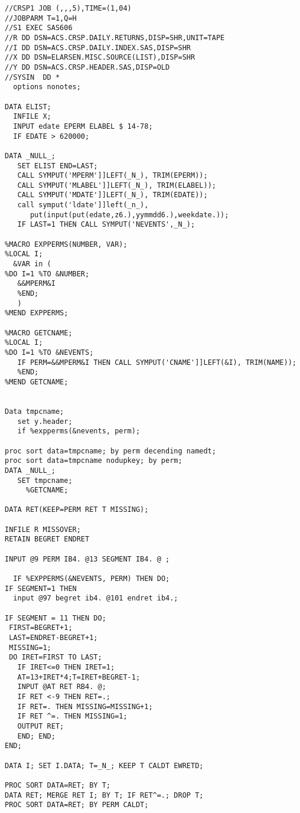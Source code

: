 \begin{singlespace}
\begin{lstlisting}[language=sas,caption=Event studies with SAS]
//CRSP1 JOB (,,,5),TIME=(1,04)
//JOBPARM T=1,Q=H
//S1 EXEC SAS606
//R DD DSN=ACS.CRSP.DAILY.RETURNS,DISP=SHR,UNIT=TAPE
//I DD DSN=ACS.CRSP.DAILY.INDEX.SAS,DISP=SHR
//X DD DSN=ELARSEN.MISC.SOURCE(LIST),DISP=SHR
//Y DD DSN=ACS.CRSP.HEADER.SAS,DISP=OLD
//SYSIN  DD *
  options nonotes;

DATA ELIST;
  INFILE X;
  INPUT edate EPERM ELABEL $ 14-78;
  IF EDATE > 620000;

DATA _NULL_;
   SET ELIST END=LAST;
   CALL SYMPUT('MPERM']]LEFT(_N_), TRIM(EPERM));
   CALL SYMPUT('MLABEL']]LEFT(_N_), TRIM(ELABEL));
   CALL SYMPUT('MDATE']]LEFT(_N_), TRIM(EDATE));
   call symput('ldate']]left(_n_),
      put(input(put(edate,z6.),yymmdd6.),weekdate.));
   IF LAST=1 THEN CALL SYMPUT('NEVENTS',_N_);

%MACRO EXPPERMS(NUMBER, VAR);
%LOCAL I;
  &VAR in (
%DO I=1 %TO &NUMBER;
   &&MPERM&I
   %END;
   )
%MEND EXPPERMS;

%MACRO GETCNAME;
%LOCAL I;
%DO I=1 %TO &NEVENTS;
   IF PERM=&&MPERM&I THEN CALL SYMPUT('CNAME']]LEFT(&I), TRIM(NAME));
   %END;
%MEND GETCNAME;


Data tmpcname;
   set y.header;
   if %expperms(&nevents, perm);

proc sort data=tmpcname; by perm decending namedt;
proc sort data=tmpcname nodupkey; by perm;
DATA _NULL_;
   SET tmpcname;
     %GETCNAME;

DATA RET(KEEP=PERM RET T MISSING);

INFILE R MISSOVER;
RETAIN BEGRET ENDRET

INPUT @9 PERM IB4. @13 SEGMENT IB4. @ ;

  IF %EXPPERMS(&NEVENTS, PERM) THEN DO;
IF SEGMENT=1 THEN
  input @97 begret ib4. @101 endret ib4.;

IF SEGMENT = 11 THEN DO;
 FIRST=BEGRET+1;
 LAST=ENDRET-BEGRET+1;
 MISSING=1;
 DO IRET=FIRST TO LAST;
   IF IRET<=0 THEN IRET=1;
   AT=13+IRET*4;T=IRET+BEGRET-1;
   INPUT @AT RET RB4. @;
   IF RET <-9 THEN RET=.;
   IF RET=. THEN MISSING=MISSING+1;
   IF RET ^=. THEN MISSING=1;
   OUTPUT RET;
   END; END;
END;

DATA I; SET I.DATA; T=_N_; KEEP T CALDT EWRETD;

PROC SORT DATA=RET; BY T;
DATA RET; MERGE RET I; BY T; IF RET^=.; DROP T;
PROC SORT DATA=RET; BY PERM CALDT;



\end{lstlisting}
\end{singlespace}
